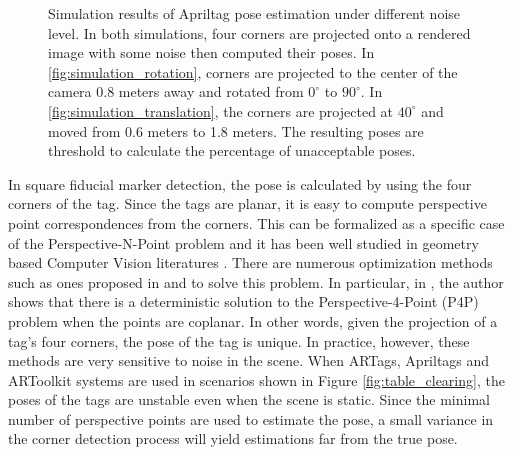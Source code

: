 \begin{figure}[h]
\caption{Simulation results of Apriltag pose estimation under different noise level. In both simulations, four corners are projected onto a rendered image with some noise then computed their poses. In \ref{fig:simulation_rotation}, corners are projected to the center of the camera 0.8 meters away and rotated from $0^{\circ}$ to $90^{\circ}$. In \ref{fig:simulation_translation}, the corners are projected at $40^{\circ}$ and moved from 0.6 meters to 1.8 meters. The resulting poses are threshold to calculate the percentage of unacceptable poses.}
\label{fig:simulation_results}
\end{figure}

In square fiducial marker detection, the pose is calculated by using the four corners of the tag. Since the tags are planar, it is easy to compute perspective point correspondences from the corners. This can be formalized as a specific case of the Perspective-N-Point problem and it has been well studied in geometry based Computer Vision literatures \citep{hartley2003multiple, zhang2005general}. There are numerous optimization methods such as ones proposed in \citep{dementhon1992exact} and \citep{haralick1994review} to solve this problem. In particular, in \citep{horaud1989analytic}, the author shows that there is a deterministic solution to the Perspective-4-Point (P4P) problem when the points are coplanar. In other words, given the projection of a tag's four corners, the pose of the tag is unique. In practice, however, these methods are very sensitive to noise in the scene. When ARTags, Apriltags and ARToolkit systems are used in scenarios shown in Figure \ref{fig:table_clearing}, the poses of the tags are unstable even when the scene is static. Since the minimal number of perspective points are used to estimate the pose, a small variance in the corner detection process will yield estimations far from the true pose. 

